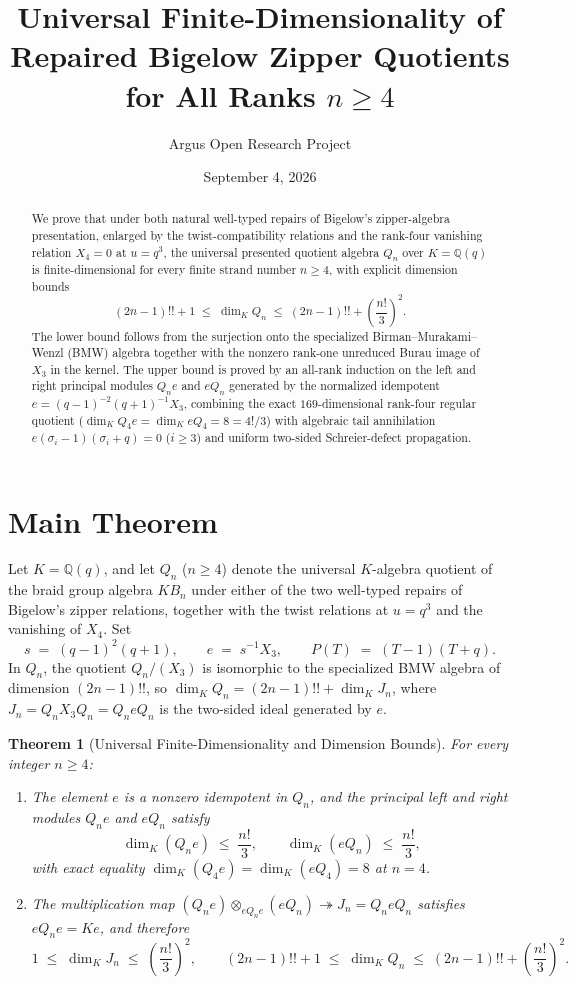 \documentclass[10pt,reqno]{amsart}
\title[Universal Finite-Dimensionality of Repaired Bigelow Zipper Quotients]
{Universal Finite-Dimensionality of Repaired Bigelow Zipper Quotients for All Ranks $n\ge 4$}
\author{Argus Open Research Project}
\date{September 4, 2026}
\newtheorem{theorem}{Theorem}[section]
\theoremstyle{definition}
\begin{document}
\begin{abstract}
We prove that under both natural well-typed repairs of Bigelow's zipper-algebra presentation, enlarged by the twist-compatibility relations and the rank-four vanishing relation $X_4=0$ at $u=q^3$, the universal presented quotient algebra $Q_n$ over $K=\mathbb{Q}(q)$ is finite-dimensional for every finite strand number $n\ge 4$, with explicit dimension bounds
\[
  (2n-1)!! + 1 \;\le\; \dim_K Q_n \;\le\; (2n-1)!! + \left(\frac{n!}{3}\right)^2.
\]
The lower bound follows from the surjection onto the specialized Birman--Murakami--Wenzl (BMW) algebra together with the nonzero rank-one unreduced Burau image of $X_3$ in the kernel. The upper bound is proved by an all-rank induction on the left and right principal modules $Q_n e$ and $e Q_n$ generated by the normalized idempotent $e=(q-1)^{-2}(q+1)^{-1}X_3$, combining the exact $169$-dimensional rank-four regular quotient ($\dim_K Q_4 e = \dim_K e Q_4 = 8 = 4!/3$) with algebraic tail annihilation $e(\sigma_i-1)(\sigma_i+q)=0$ ($i\ge 3$) and uniform two-sided Schreier-defect propagation.
\end{abstract}

\maketitle

\section{Main Theorem}

Let $K=\mathbb{Q}(q)$, and let $Q_n$ ($n\ge 4$) denote the universal $K$-algebra quotient of the braid group algebra $K B_n$ under either of the two well-typed repairs of Bigelow's zipper relations, together with the twist relations at $u=q^3$ and the vanishing of $X_4$. Set
\[
  s \;=\; (q-1)^2(q+1),\qquad e \;=\; s^{-1}X_3,\qquad P(T) \;=\; (T-1)(T+q).
\]
In $Q_n$, the quotient $Q_n / (X_3)$ is isomorphic to the specialized BMW algebra of dimension $(2n-1)!!$, so $\dim_K Q_n = (2n-1)!! + \dim_K J_n$, where $J_n = Q_n X_3 Q_n = Q_n e Q_n$ is the two-sided ideal generated by $e$.

\begin{theorem}[Universal Finite-Dimensionality and Dimension Bounds]\label{thm:main}
For every integer $n\ge 4$:
\begin{enumerate}[label=\textup{(\arabic*)}]
  \item The element $e$ is a nonzero idempotent in $Q_n$, and the principal left and right modules $Q_n e$ and $e Q_n$ satisfy
  \[
    \dim_K(Q_n e) \;\le\; \frac{n!}{3},\qquad \dim_K(e Q_n) \;\le\; \frac{n!}{3},
  \]
  with exact equality $\dim_K(Q_4 e)=\dim_K(e Q_4)=8$ at $n=4$.
  \item The multiplication map $(Q_n e)\otimes_{e Q_n e}(e Q_n)\twoheadrightarrow J_n = Q_n e Q_n$ satisfies $e Q_n e = K e$, and therefore
  \[
    1 \;\le\; \dim_K J_n \;\le\; \left(\frac{n!}{3}\right)^2,
    \qquad
    (2n-1)!! + 1 \;\le\; \dim_K Q_n \;\le\; (2n-1)!! + \left(\frac{n!}{3}\right)^2.
  \]
\end{enumerate}
\end{theorem}
\end{document}
